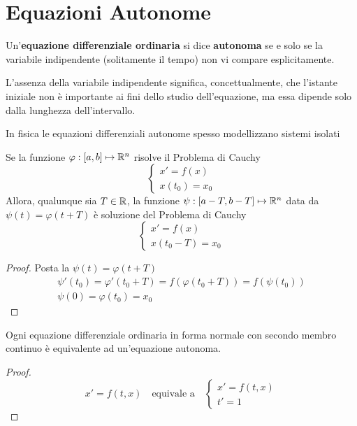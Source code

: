 \section{Equazioni Autonome}
\begin{definition}
	Un'\textbf{equazione differenziale ordinaria} si dice \textbf{autonoma} se e solo se la variabile indipendente (solitamente il tempo) non vi compare esplicitamente.
	\begin{note}
		L'assenza della variabile indipendente significa, concettualmente, che l'istante iniziale non è importante ai fini dello studio dell'equazione, ma essa dipende solo dalla lunghezza dell'intervallo.
	\end{note}
	\vspace*{-5ex}
	\begin{note}
		In fisica le equazioni differenziali autonome spesso modellizzano sistemi isolati
	\end{note}
\end{definition}
\begin{proposition}
	Se la funzione $\varphi: \left[a,b\right] \mapsto \mathbb{R}^n$ risolve il Problema di Cauchy
	\begin{equation*}\begin{cases}
		x'=f(x)\\
		x(t_0) = x_0
	\end{cases}\end{equation*}
	Allora, qualunque sia $T \in \mathbb{R}$, la funzione $\psi: \left[a - T,b - T\right] \mapsto \mathbb{R}^n$ data da $\psi(t) = \varphi(t + T)$ è soluzione del Problema di Cauchy
	\begin{equation*}\begin{cases}
		x'=f(x)\\
		x(t_0 - T) = x_0
	\end{cases}\end{equation*}
	\begin{proof}
		Posta la $\psi(t)=\varphi(t+T)$
		\begin{equation*}\begin{gathered}
			\psi'(t_0)= \varphi'(t_0+T)=f(\varphi(t_0+T))=f(\psi(t_0))\\
			\psi(0)=\varphi(t_0)=x_0
		\end{gathered}\end{equation*}
	\end{proof}
\end{proposition}
\begin{proposition}
	Ogni equazione differenziale ordinaria in forma normale con secondo membro continuo è equivalente ad un'equazione autonoma.
	\begin{proof}
		\begin{equation*}
			x' = f(t,x)
			\quad\text{equivale a}\quad
			\begin{cases}
				x'=f(t,x)\\
				t'=1
			\end{cases}
		\end{equation*}
	\end{proof}
\end{proposition}
